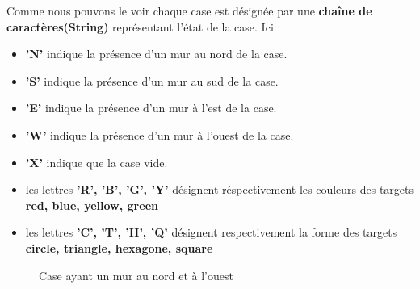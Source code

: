 \documentclass[12pt]{article}
\begin{document}
	Comme nous pouvons le voir chaque case est désignée par une \textbf{chaîne de caractères(String)} représentant l'état de la case. Ici :
	\begin{itemize}
		\item \textbf{'N'} indique la présence d'un mur au nord de la case.
		\item \textbf{'S'} indique la présence d'un mur au sud de la case.
		\item \textbf{'E'} indique la présence d'un mur à l'est de la case.
		\item \textbf{'W'} indique la présence d'un mur à l'ouest de la case.
		\item \textbf{'X'} indique que la case vide.
		\item les lettres \textbf{'R', 'B', 'G', 'Y'} désignent réspectivement les couleurs des targets \textbf{red, blue, yellow, green}
		\item les lettres \textbf{'C', 'T', 'H', 'Q'} désignent respectivement la forme des targets \textbf{circle, triangle, hexagone, square} 
	\end{itemize}	
	\begin{minipage}
		
		\vspace{0.5cm}
		\begin{center}
		\end{center}  
		\vspace{0.5cm}
	\end{minipage}
            
            \begin{figure}[H]
                \centering
                \caption{Case ayant un mur au nord et à l'ouest}
            \end{figure}
\end{document}
